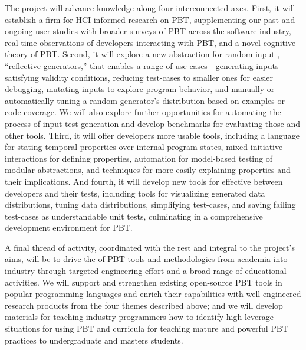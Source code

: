 The project will advance knowledge along four
interconnected axes.
%
First, it will establish a firm  for HCI-informed
research on PBT, supplementing our past and ongoing user studies with
broader surveys of PBT across the software industry, real-time
observations of developers interacting with PBT, and a novel cognitive
theory of PBT.
%
Second, it will explore a new abstraction for random input , ``reflective generators,'' that enables a range of use cases---generating inputs
satisfying validity conditions, reducing test-cases to smaller ones for easier
debugging,
mutating inputs to explore program behavior,
and manually or automatically tuning a random
generator's distribution based on examples or code coverage. We will also
explore further opportunities for automating the process of input test
generation and develop benchmarks for evaluating those and other tools.
%
Third, it will offer developers more usable  tools,
including a language for stating temporal properties over internal
program states, mixed-initiative interactions for defining properties,
automation for model-based testing of
modular abstractions, and techniques for more easily explaining properties and
their implications.
%
And fourth, it will develop new tools for effective  between developers and their tests, including tools for
visualizing generated data
distributions, tuning data distributions, simplifying test-cases, and saving
  failing test-cases as understandable unit tests, culminating in a
  comprehensive development environment for PBT.

A final thread of activity, coordinated with the rest and integral to the
project's aims, will
%
be to drive the  of PBT tools and
methodologies from academia into industry through targeted engineering effort
and a broad range of educational activities.
We will support and strengthen existing
open-source PBT tools in popular programming languages and enrich their
capabilities with well engineered research products from the four
themes described above;
%
and we will
develop materials for teaching industry programmers how to identify
high-leverage situations for using PBT and curricula for teaching mature
and powerful PBT practices to undergraduate and masters students.
%

